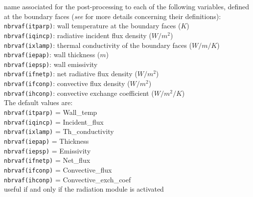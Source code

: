 {name associated for the post-processing to each of the following variables,
defined at the boundary faces ({\it see}
\cite{Douce02} for more details concerning their definitions):\\
\hspace*{1.3cm} {\tt nbrvaf(itparp)}: wall temperature at the boundary
faces ($K$)\\
\hspace*{1.3cm} {\tt nbrvaf(iqincp)}: radiative incident flux density
($W/m^2$)\\
\hspace*{1.3cm} {\tt nbrvaf(ixlamp)}: thermal conductivity of the
boundary faces ($W/m/K$)\\
\hspace*{1.3cm} {\tt nbrvaf(iepap)}: wall thickness ($m$)\\
\hspace*{1.3cm} {\tt nbrvaf(iepsp)}: wall emissivity \\
\hspace*{1.3cm} {\tt nbrvaf(ifnetp)}: net radiative flux density ($W/m^2$)\\
\hspace*{1.3cm} {\tt nbrvaf(ifconp)}: convective flux density ($W/m^2$)\\
\hspace*{1.3cm} {\tt nbrvaf(ihconp)}: convective exchange coefficient
($W/m^2/K$)\\
The default values are: \\
\hspace*{1.3cm} {\tt nbrvaf(itparp)} = Wall\_temp \\
\hspace*{1.3cm} {\tt nbrvaf(iqincp)} = Incident\_flux \\
\hspace*{1.3cm} {\tt nbrvaf(ixlamp)} = Th\_conductivity \\
\hspace*{1.3cm} {\tt nbrvaf(iepap)} = Thickness \\
\hspace*{1.3cm} {\tt nbrvaf(iepsp)} = Emissivity \\
\hspace*{1.3cm} {\tt nbrvaf(ifnetp)} = Net\_flux \\
\hspace*{1.3cm} {\tt nbrvaf(ifconp)} = Convective\_flux \\
\hspace*{1.3cm} {\tt nbrvaf(ihconp)} = Convective\_exch\_coef \\
useful if and only if the radiation module is activated}


